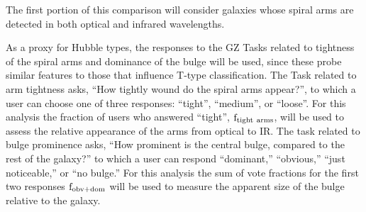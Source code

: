 The first portion of this comparison will consider galaxies whose spiral arms are detected in both optical and infrared wavelengths. 

As a proxy for Hubble types, the responses to the GZ Tasks related to tightness of the spiral arms and dominance of the bulge will be used, since these probe similar features to those that influence T-type classification. The Task related to arm tightness asks, ``How tightly wound do the spiral arms appear?'', to which a user can choose one of three responses: ``tight'', ``medium'', or ``loose''. For this analysis the fraction of users who answered ``tight'', $\rm f_{tight~arms}$, will be used to assess the relative appearance of the arms from optical to IR. The task related to bulge prominence asks, ``How prominent is the central bulge, compared to the rest of the galaxy?'' to which a user can respond ``dominant,'' ``obvious,'' ``just noticeable,'' or ``no bulge.'' For this analysis the sum of vote fractions for the first two responses $\rm f_{obv+dom} $ will be used to measure the apparent size of the bulge relative to the galaxy.   

